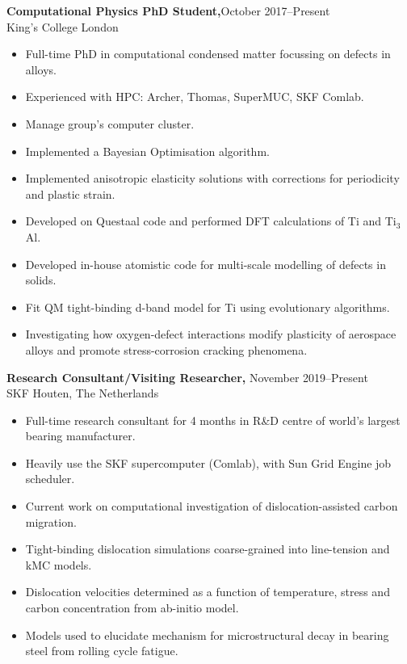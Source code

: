 \documentclass[margin]{res}
\begin{document}
\begin{resume}
{\bf Computational Physics PhD Student,}\hfill October 2017--Present\\King's College London
  \begin{itemize} \itemsep -2pt  %
    \item Full-time PhD in computational condensed matter focussing on defects in alloys. 
    \item Experienced with HPC: Archer, Thomas, SuperMUC, SKF Comlab. 
    \item Manage group's computer cluster.
    \item Implemented a Bayesian Optimisation algorithm.
    \item Implemented anisotropic elasticity solutions with corrections for periodicity and plastic strain. 
    \item Developed on Questaal code and performed DFT calculations of Ti and Ti$_3$Al.
    \item Developed in-house atomistic code for multi-scale modelling of defects in solids. 
    \item Fit QM tight-binding d-band model for Ti using evolutionary algorithms.
    \item Investigating how oxygen-defect interactions modify plasticity of aerospace alloys and promote stress-corrosion cracking phenomena.
  \end{itemize}


 {\bf Research Consultant/Visiting Researcher,} \hfill November 2019--Present\\ SKF Houten, The Netherlands
  \begin{itemize} \itemsep -2pt  %
    \item Full-time research consultant for 4 months in R\&D centre of world's largest bearing manufacturer.
    \item Heavily use the SKF supercomputer (Comlab), with Sun Grid Engine job scheduler. 
    \item Current work on computational investigation of dislocation-assisted carbon migration. 
    \item Tight-binding dislocation simulations coarse-grained into line-tension and kMC models. 
    \item Dislocation velocities determined as a function of temperature, stress and carbon concentration from ab-initio model. 
    \item Models used to elucidate mechanism for microstructural decay in bearing steel from rolling cycle fatigue.  
  \end{itemize}



\end{resume}
\end{document}
